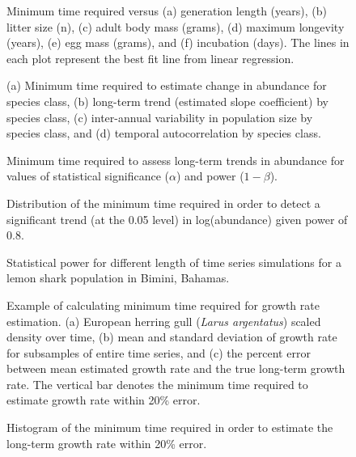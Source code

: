 \documentclass[12pt,]{article}
\begin{document}
\begin{figure}[htbp]
\centering
\caption{Minimum time required versus (a) generation length (years), (b)
litter size (n), (c) adult body mass (grams), (d) maximum longevity
(years), (e) egg mass (grams), and (f) incubation (days). The lines in
each plot represent the best fit line from linear
regression.\label{fig:biological_correlates}}
\end{figure}

\begin{figure}[htbp]
\centering
\caption{(a) Minimum time required to estimate change in abundance for
species class, (b) long-term trend (estimated slope coefficient) by
species class, (c) inter-annual variability in population size by species
class, and (d) temporal autocorrelation by species
class.\label{fig:class}}
\end{figure}

\begin{figure}[htbp]
\centering
\caption{Minimum time required to assess long-term trends in abundance
for values of statistical significance (\(\alpha\)) and power
(\(1-\beta\)).\label{fig:min_time_vs_alpha_beta}}
\end{figure}

\begin{figure}[htbp]
\centering
\caption{Distribution of the minimum time required in order to detect a
significant trend (at the 0.05 level) in log(abundance) given power of
0.8.\label{fig:min_time_dist_log_pop}}
\end{figure}

\begin{figure}[htbp]
\centering
\caption{Statistical power for different length of time series
simulations for a lemon shark population in Bimini,
Bahamas.\label{fig:shark_example}}
\end{figure}

\begin{figure}[htbp]
\centering
\caption{Example of calculating minimum time required for growth rate
estimation. (a) European herring gull (\emph{Larus argentatus}) scaled
density over time, (b) mean and standard deviation of growth rate for
subsamples of entire time series, and (c) the percent error between mean
estimated growth rate and the true long-term growth rate. The vertical
bar denotes the minimum time required to estimate growth rate within
20\% error.\label{fig:growth_rate}}
\end{figure}

\begin{figure}[htbp]
\centering
\caption{Histogram of the minimum time required in order to estimate the
long-term growth rate within 20\%
error.\label{fig:min_time_growth_dist}}
\end{figure}
\end{document}
